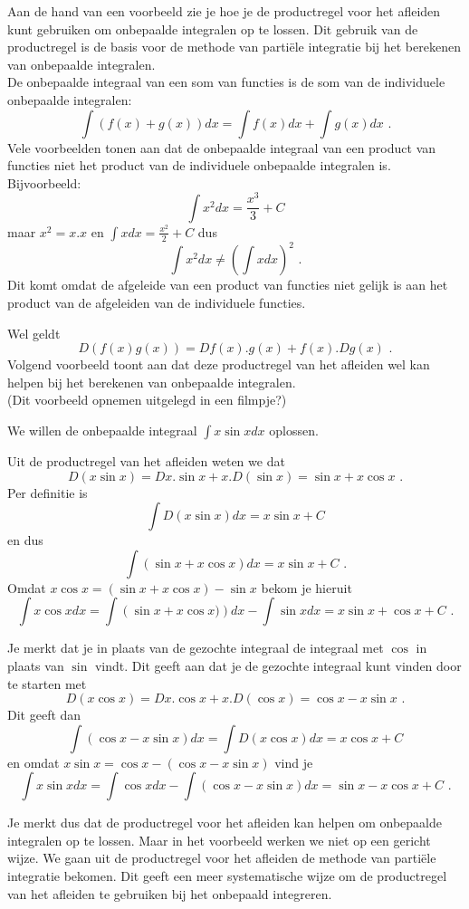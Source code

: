 \documentclass{article}
\begin{document}
Aan de hand van een voorbeeld zie je hoe je de productregel voor het afleiden kunt gebruiken om onbepaalde integralen op te lossen.
Dit gebruik van de productregel is de basis voor de methode van parti\"ele integratie bij het berekenen van onbepaalde integralen.\\

De onbepaalde integraal van een som van functies is de som van de individuele onbepaalde integralen:
\[
\int (f(x)+g(x))dx=\int f(x)dx + \int g(x)dx \text { .}
\]
Vele voorbeelden tonen aan dat de onbepaalde integraal van een product van functies niet het product van de individuele onbepaalde integralen is.
Bijvoorbeeld:
\[
\int x^2dx = \frac{x^3}{3}+C
\]
maar $x^2=x.x$ en $\int xdx=\frac{x^2}{2}+C$ dus
\[
\int x^2dx \neq \left( \int xdx \right)^2 \text { .}
\]
Dit komt omdat de afgeleide van een product van functies niet gelijk is aan het product van de afgeleiden van de individuele functies.

Wel geldt
\[
D\left( f(x)g(x) \right)=Df(x).g(x)+f(x).Dg(x) \text { .}
\]
Volgend voorbeeld toont aan dat deze productregel van het afleiden wel kan helpen bij het berekenen van onbepaalde integralen.\\

\noindent (Dit voorbeeld opnemen uitgelegd in een filmpje?)

We willen de onbepaalde integraal $\int x\sin xdx$ oplossen.

Uit de productregel van het afleiden weten we dat
\[
D(x\sin x)=Dx.\sin x+x.D(\sin x)=\sin x +x \cos x \text { .}
\]
Per definitie is
\[
\int D(x \sin x)dx=x \sin x +C
\]
en dus
\[
\int \left( \sin x +x \cos x \right) dx = x \sin x +C \text { .}
\]
Omdat $x \cos x = \left( \sin x +x \cos x \right)- \sin x$ bekom je hieruit
\[
\int x \cos x dx = \int \left( \sin x + x \cos x) \right) dx - \int \sin x dx= x \sin x + \cos x +C \text { .}
\]

Je merkt dat je in plaats van de gezochte integraal de integraal met $\cos$ in plaats van $\sin$ vindt.
Dit geeft aan dat je de gezochte integraal kunt vinden door te starten met
\[
D(x \cos x)=Dx.\cos x+x.D(\cos x)=\cos x -x \sin x \text { .}
\]
Dit geeft dan
\[
\int \left( \cos x - x \sin x \right)dx=\int D(x \cos x)dx=x \cos x +C
\]
en omdat $x \sin x = \cos x - \left( \cos x - x \sin x \right)$ vind je
\[
\int x \sin x dx = \int \cos x dx- \int \left( \cos x-x \sin x \right) dx=\sin x - x \cos x +C \text { .}
\]

Je merkt dus dat de productregel voor het afleiden kan helpen om onbepaalde integralen op te lossen.
Maar in het voorbeeld werken we niet op een gericht wijze.
We gaan uit de productregel voor het afleiden de methode van parti\"ele integratie bekomen.
Dit geeft een meer systematische wijze om de productregel van het afleiden te gebruiken bij het onbepaald integreren.
\end{document}
